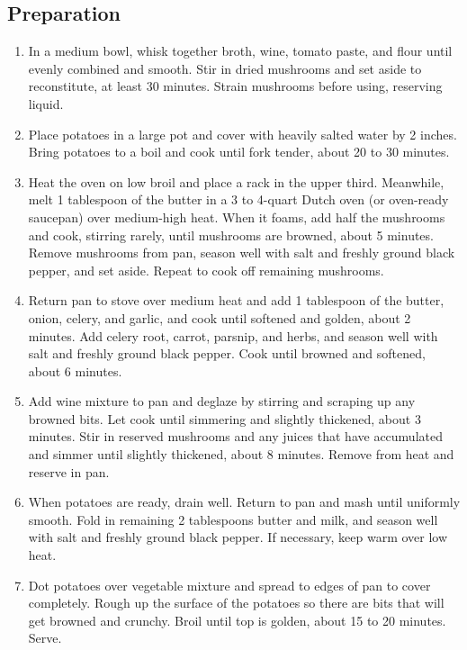 \subsection{Preparation}
\begin{enumerate}
    \item In a medium bowl, whisk together broth, wine, tomato paste, and flour until evenly combined and smooth. Stir in dried mushrooms and set aside to reconstitute, at least 30 minutes. Strain mushrooms before using, reserving liquid.
    \item Place potatoes in a large pot and cover with heavily salted water by 2 inches. Bring potatoes to a boil and cook until fork tender, about 20 to 30 minutes.
    \item Heat the oven on low broil and place a rack in the upper third. Meanwhile, melt 1 tablespoon of the butter in a 3 to 4-quart Dutch oven (or oven-ready saucepan) over medium-high heat. When it foams, add half the mushrooms and cook, stirring rarely, until mushrooms are browned, about 5 minutes. Remove mushrooms from pan, season well with salt and freshly ground black pepper, and set aside. Repeat to cook off remaining mushrooms.
    \item Return pan to stove over medium heat and add 1 tablespoon of the butter, onion, celery, and garlic, and cook until softened and golden, about 2 minutes. Add celery root, carrot, parsnip, and herbs, and season well with salt and freshly ground black pepper. Cook until browned and softened, about 6 minutes.
    \item Add wine mixture to pan and deglaze by stirring and scraping up any browned bits. Let cook until simmering and slightly thickened, about 3 minutes. Stir in reserved mushrooms and any juices that have accumulated and simmer until slightly thickened, about 8 minutes. Remove from heat and reserve in pan.
    \item When potatoes are ready, drain well. Return to pan and mash until uniformly smooth. Fold in remaining 2 tablespoons butter and milk, and season well with salt and freshly ground black pepper. If necessary, keep warm over low heat. 
    \item Dot potatoes over vegetable mixture and spread to edges of pan to cover completely. Rough up the surface of the potatoes so there are bits that will get browned and crunchy. Broil until top is golden, about 15 to 20 minutes. Serve.
\end{enumerate}
